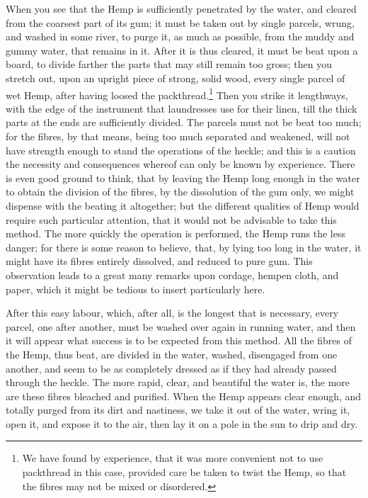 \documentclass[a4paper, 11pt, oneside, polutonikogreek, english]{article}
\begin{document}
When you see that the Hemp is sufficiently penetrated by the water, and cleared from the coarsest part of its gum; it must be taken out by single parcels, wrung, and washed in some river, to purge it, as much as possible, from the muddy and gummy water, that remains in it. After it is thus cleared, it must be beat upon a board, to divide farther the parts that may still remain too gross; then you stretch out, upon an upright piece of strong, solid wood, every single parcel of wet Hemp, after having loosed the packthread.\footnote{We have found by experience, that it was more convenient not to use packthread in this case, provided care be taken to twist the Hemp, so that the fibres may not be mixed or disordered.} Then you strike it lengthways, with the edge of the instrument that laundresses use for their linen, till the thick parts at the ends are sufficiently divided. The parcels must not be beat too much; for the fibres, by that means, being too much separated and weakened, will not have strength enough to stand the operations of the heckle; and this is a caution the necessity and consequences whereof can only be known by experience. There is even good ground to think, that by leaving the Hemp long enough in the water to obtain the division of the fibres, by the dissolution of the gum only, we might dispense with the beating it altogether; but the different qualities of Hemp would require such particular attention, that it would not be advisable to take this method. The more quickly the operation is performed, the Hemp runs the less danger; for there is some reason to believe, that, by lying too long in the water, it might have its fibres entirely dissolved, and reduced to pure gum. This observation leads to a great many remarks upon cordage, hempen cloth, and paper, which it might be tedious to insert particularly here.

After this easy labour, which, after all, is the longest that is necessary, every parcel, one after another, must be washed over again in running water, and then it will appear what success is to be expected from this method. All the fibres of the Hemp, thus beat, are divided in the water, washed, disengaged from one another, and seem to be as completely dressed as if they had already passed through the heckle. The more rapid, clear, and beautiful the water is, the more are these fibres bleached and purified. When the Hemp appears clear enough, and totally purged from its dirt and nastiness, we take it out of the water, wring it, open it, and expose it to the air, then lay it on a pole in the sun to drip and dry.
\end{document}
